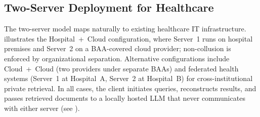 \documentclass[conference]{IEEEtran}
\begin{document}
\subsection{Two-Server Deployment for Healthcare}
\label{sec:deployment}

The two-server model maps naturally to existing healthcare IT infrastructure.
 illustrates the Hospital~+~Cloud configuration,
where Server~1 runs on hospital premises and Server~2 on a BAA-covered
cloud provider; non-collusion is enforced by organizational separation.
Alternative configurations include Cloud~+~Cloud (two providers under
separate BAAs) and federated health systems (Server~1 at Hospital~A,
Server~2 at Hospital~B) for cross-institutional private retrieval.
In all cases, the client initiates queries, reconstructs results, and
passes retrieved documents to a locally hosted LLM that never
communicates with either server (see ).
\end{document}
